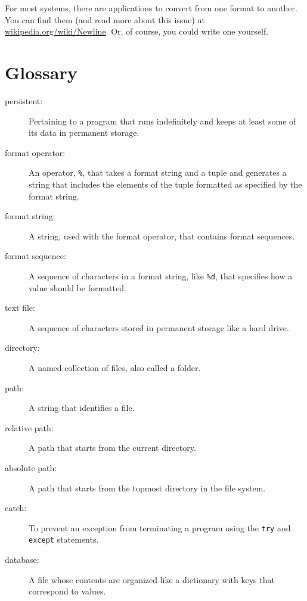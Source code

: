 \documentclass[10pt]{book}
\begin{document}

For most systems, there are applications to convert from one
format to another.  You can find them (and read more about this
issue) at \url{wikipedia.org/wiki/Newline}.  Or, of course, you
could write one yourself.


\section{Glossary}

\begin{description}

\item[persistent:] Pertaining to a program that runs indefinitely
and keeps at least some of its data in permanent storage.

\item[format operator:] An operator, {\tt \%}, that takes a format
string and a tuple and generates a string that includes
the elements of the tuple formatted as specified by the format string.

\item[format string:] A string, used with the format operator, that
contains format sequences.  

\item[format sequence:] A sequence of characters in a format string,
like {\tt \%d}, that specifies how a value should be formatted.

\item[text file:] A sequence of characters stored in permanent
storage like a hard drive.

\item[directory:] A named collection of files, also called a folder.

\item[path:] A string that identifies a file.

\item[relative path:] A path that starts from the current directory.

\item[absolute path:] A path that starts from the topmost directory
in the file system.

\item[catch:] To prevent an exception from terminating
a program using the {\tt try}
and {\tt except} statements.

\item[database:] A file whose contents are organized like a dictionary
with keys that correspond to values.

\end{description}
\end{document}
